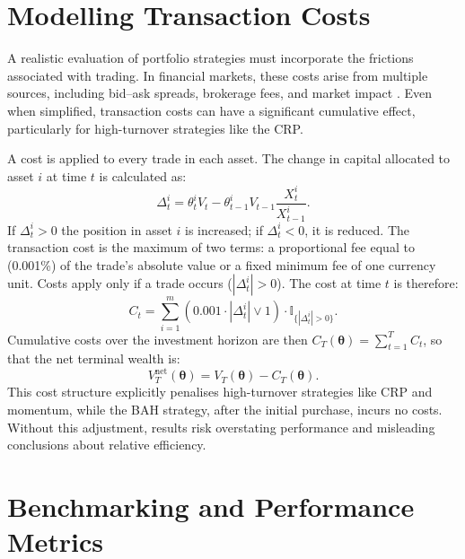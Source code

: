 \documentclass[12pt,a4paper]{report}
\begin{document}
\section{Modelling Transaction Costs}
\label{sec:transaction_costs}

A realistic evaluation of portfolio strategies must incorporate the frictions associated with trading. In financial markets, these costs arise from multiple sources, including bid–ask spreads, brokerage fees, and market impact \citep{DeMiguel2009}. Even when simplified, transaction costs can have a significant cumulative effect, particularly for high-turnover strategies like the CRP.

A cost is applied to every trade in each asset. The change in capital allocated to asset \( i \) at time \( t \) is calculated as:
\begin{equation}
\Delta^i_t = \theta^i_t V_t - \theta^i_{t-1} V_{t-1} \frac{X^i_t}{X^i_{t-1}}.
\label{eq:traded_amount}
\end{equation}
If \( \Delta^i_t > 0 \) the position in asset \( i \) is increased; if \( \Delta^i_t < 0 \), it is reduced. The transaction cost is the maximum of two terms: a proportional fee equal to (0.001\%) of the trade's absolute value or a fixed minimum fee of one currency unit. Costs apply only if a trade occurs (\( |\Delta^i_t| > 0 \)). The cost at time \( t \) is therefore:
\begin{equation}
C_t = \sum_{i=1}^{m} \left( 0.001 \cdot |\Delta^i_t| \lor 1 \right) \cdot \mathbb{I}_{\{ |\Delta^i_t| > 0 \}}.
\label{eq:transaction_cost}
\end{equation}
Cumulative costs over the investment horizon are then \( C_T(\boldsymbol{\theta}) = \sum_{t=1}^{T} C_t \), so that the net terminal wealth is:
\begin{equation}
V^{\text{net}}_T(\boldsymbol{\theta}) = V_T(\boldsymbol{\theta}) - C_T(\boldsymbol{\theta}).
\label{eq:net_value}
\end{equation}
This cost structure explicitly penalises high-turnover strategies like CRP and momentum, while the BAH strategy, after the initial purchase, incurs no costs. Without this adjustment, results risk overstating performance and misleading conclusions about relative efficiency.

\section{Benchmarking and Performance Metrics}
\label{sec:benchmarking}
\end{document}
